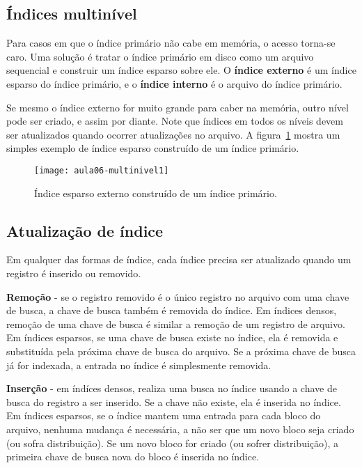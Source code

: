\subsection{Índices multinível}

Para casos em que o índice primário não cabe em memória, o acesso torna-se caro.
Uma solução é tratar o índice primário em disco como um arquivo sequencial e
construir um índice esparso sobre ele.
O \textbf{índice externo} é um índice esparso do índice primário, e 
o \textbf{índice interno} é o arquivo do índice primário.

Se mesmo o índice externo for muito grande para caber na memória, outro nível
pode ser criado, e assim por diante.
Note que índices em todos os níveis devem ser atualizados quando ocorrer
atualizações no arquivo.
A figura~\ref{aula06:fig:multinivel} mostra um simples exemplo de índice esparso
construído de um índice primário.
%
\begin{figure}[!htb]
\centering
\texttt{[image: aula06-multinivel1]}
\caption{Índice esparso externo construído de um índice primário.}
\label{aula06:fig:multinivel}
\end{figure}

\subsection{Atualização de índice}

Em qualquer das formas de índice, cada índice precisa ser atualizado quando um
registro é inserido ou removido.

{\bf Remoção} - se o registro removido é o único registro no arquivo
com uma chave de busca, a chave de busca também é removida do índice.
Em índices densos, remoção de uma chave de busca é similar a remoção
de um registro de arquivo.
Em índices esparsos, se uma chave de busca existe no índice, ela é removida 
e substituída pela próxima chave de busca do arquivo.
Se a próxima chave de busca já for indexada, a entrada no índice é simplesmente 
removida.

{\bf Inserção} - em índíces densos, realiza uma busca no índice usando a chave de
busca do registro a ser inserido.
Se a chave não existe, ela é inserida no índice.
Em índices esparsos, se o índice mantem uma entrada para cada bloco do arquivo,
nenhuma mudança é necessária, a não ser que um novo bloco seja criado (ou sofra
distribuição).
Se um novo bloco for criado (ou sofrer distribuição), 
a primeira chave de busca nova do bloco é inserida no índice.

